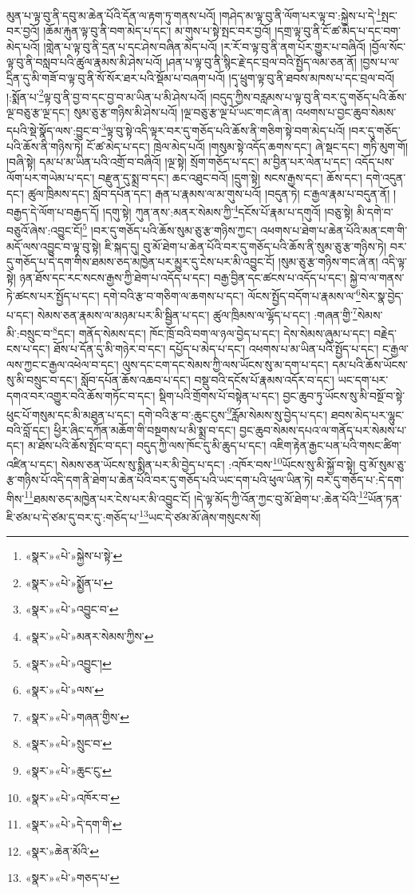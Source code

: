 མུན་པ་ལྟ་བུ་ནི་དབུ་མ་ཆེན་པོའི་དོན་ལ་རྟག་ཏུ་གནས་པའོ། །གཤེད་མ་ལྟ་བུ་ནི་ལོག་པར་ལྟ་བ་:སྐྱེས་པ་དེ་\footnote{«སྣར་»«པེ་»སྐྱེས་པ་སྟེ་}སྤང་བར་བྱའོ། །ཆོམ་རྐུན་ལྟ་བུ་ནི་བག་མེད་པ་དང་། མ་གུས་པ་སྟེ་སྤང་བར་བྱའོ། །དགྲ་ལྟ་བུ་ནི་ངོ་ཚ་མེད་པ་དང་བག་མེད་པའོ། །གླེན་པ་ལྟ་བུ་ནི་དྲན་པ་དང་ཤེས་བཞིན་མེད་པའོ། །ར་རོ་བ་ལྟ་བུ་ནི་ནག་པོར་གྱུར་པ་བཞིའོ། །བྱོལ་སོང་ལྟ་བུ་ནི་བསླབ་པའི་ཚུལ་རྣམས་མི་ཤེས་པའོ། །ཤན་པ་ལྟ་བུ་ནི་སྙིང་རྗེ་དང་བྲལ་བའི་སྤྱོད་ལམ་ཅན་ནོ། །བྱས་པ་ལ་དྲིན་དུ་མི་གཟོ་བ་ལྟ་བུ་ནི་སོ་སོར་ཐར་པའི་སྡོམ་པ་བཞག་པའོ། །དྭ་ཕྲུག་ལྟ་བུ་ནི་ཐབས་མཁས་པ་དང་བྲལ་བའོ། །:སྨོན་པ་\footnote{«སྣར་»«པེ་»སྨྱོན་པ་}ལྟ་བུ་ནི་བྱ་བ་དང་བྱ་བ་མ་ཡིན་པ་མི་ཤེས་པའོ། །བདུད་ཀྱིས་བརླམས་པ་ལྟ་བུ་ནི་བར་དུ་གཅོད་པའི་ཆོས་ལྔ་བཅུ་རྩ་ལྔ་དང་། སུམ་ཅུ་རྩ་གཉིས་མི་ཤེས་པའོ། །ལྔ་བཅུ་རྩ་ལྔ་པོ་ཡང་གང་ཞེ་ན། འཕགས་པ་བྱང་ཆུབ་སེམས་དཔའི་སྡེ་སྣོད་ལས་:བྱུང་བ་\footnote{«སྣར་»«པེ་»འབྱུང་བ་}ལྟ་བུ་སྟེ་འདི་ལྟར་བར་དུ་གཅོད་པའི་ཆོས་ནི་གཅིག་སྟེ་བག་མེད་པའོ། །བར་དུ་གཅོད་པའི་ཆོས་ནི་གཉིས་ཏེ། ངོ་ཚ་མེད་པ་དང་། ཁྲེལ་མེད་པའོ། །གསུམ་སྟེ་འདོད་ཆགས་དང་། ཞེ་སྡང་དང་། གཏི་མུག་གོ། །བཞི་སྟེ། དམ་པ་མ་ཡིན་པའི་འགྲོ་བ་བཞིའོ། །ལྔ་སྟེ། སྲོག་གཅོད་པ་དང་། མ་བྱིན་པར་ལེན་པ་དང་། འདོད་པས་ལོག་པར་གཡེམ་པ་དང་། བརྫུན་དུ་སྨྲ་བ་དང་། ཆང་འཐུང་བའོ། །དྲུག་སྟེ། སངས་རྒྱས་དང་། ཆོས་དང་། དགེ་འདུན་དང་། ཚུལ་ཁྲིམས་དང་། སློབ་དཔོན་དང་། རྒན་པ་རྣམས་ལ་མ་གུས་པའོ། །བདུན་ཏེ། ང་རྒྱལ་རྣམ་པ་བདུན་ནོ། །བརྒྱད་དེ་ལོག་པ་བརྒྱད་དོ། །དགུ་སྟེ། ཀུན་ནས་:མནར་སེམས་ཀྱི་\footnote{«སྣར་»«པེ་»མནར་སེམས་ཀྱིས་}དངོས་པོ་རྣམ་པ་དགུའོ། །བཅུ་སྟེ། མི་དགེ་བ་བཅུའོ་ཞེས་:འབྱུང་ངོ།\footnote{«སྣར་»«པེ་»འབྱུང་།} །བར་དུ་གཅོད་པའི་ཆོས་སུམ་ཅུ་རྩ་གཉིས་ཀྱང་། འཕགས་པ་ཐེག་པ་ཆེན་པོའི་མན་ངག་གི་མདོ་ལས་འབྱུང་བ་ལྟ་བུ་སྟེ། ཇི་སྐད་དུ། བུ་མོ་ཐེག་པ་ཆེན་པོའི་བར་དུ་གཅོད་པའི་ཆོས་ནི་སུམ་ཅུ་རྩ་གཉིས་ཏེ། བར་དུ་གཅོད་པ་དེ་དག་གིས་ཐམས་ཅད་མཁྱེན་པར་མྱུར་དུ་ངེས་པར་མི་འབྱུང་ངོ། །སུམ་ཅུ་རྩ་གཉིས་གང་ཞེ་ན། འདི་ལྟ་སྟེ། ཉན་ཐོས་དང་རང་སངས་རྒྱས་ཀྱི་ཐེག་པ་འདོད་པ་དང་། བརྒྱ་བྱིན་དང་ཚངས་པ་འདོད་པ་དང་། སྐྱེ་བ་ལ་གནས་ཏེ་ཚངས་པར་སྤྱོད་པ་དང་། དགེ་བའི་རྩ་བ་གཅིག་ལ་ཆགས་པ་དང་། ལོངས་སྤྱོད་བདོག་པ་རྣམས་ལ་\footnote{«སྣར་»«པེ་»ལས་}སེར་སྣ་བྱེད་པ་དང་། སེམས་ཅན་རྣམས་ལ་མཉམ་པར་མི་སྦྱིན་པ་དང་། ཚུལ་ཁྲིམས་ལ་ལྷོད་པ་དང་། :གཞན་གྱི་\footnote{«སྣར་»«པེ་»གཞན་གྱིས་}སེམས་མི་:བསྲུང་བ་\footnote{«སྣར་»«པེ་»སྲུང་བ་}དང་། གནོད་སེམས་དང་། ཁོང་ཁྲོ་བའི་བག་ལ་ཉལ་བྱེད་པ་དང་། དེས་སེམས་ཞུམ་པ་དང་། བརྗེད་ངས་པ་དང་། ཐོས་པ་དོན་དུ་མི་གཉེར་བ་དང་། དཔྱོད་པ་མེད་པ་དང་། འཕགས་པ་མ་ཡིན་པའི་སྤྱོད་པ་དང་། ང་རྒྱལ་ལས་ཀྱང་ང་རྒྱལ་འཕེལ་བ་དང་། ལུས་དང་ངག་དང་སེམས་ཀྱི་ལས་ཡོངས་སུ་མ་དག་པ་དང་། དམ་པའི་ཆོས་ཡོངས་སུ་མི་བསྲུང་བ་དང་། སློབ་དཔོན་ཆོས་འཆབ་པ་དང་། བསྡུ་བའི་དངོས་པོ་རྣམས་འདོར་བ་དང་། ཡང་དག་པར་དགའ་བར་འགྱུར་བའི་ཆོས་གཏོང་བ་དང་། སྡིག་པའི་གྲོགས་པོ་བསྟེན་པ་དང་། བྱང་ཆུབ་ཏུ་ཡོངས་སུ་མི་བསྔོ་བ་སྟེ་ཕུང་པོ་གསུམ་དང་མི་མཐུན་པ་དང་། དགེ་བའི་རྩ་བ་:ཆུང་ངུས་\footnote{«སྣར་»«པེ་»ཆུང་ངུ་}རློམ་སེམས་སུ་བྱེད་པ་དང་། ཐབས་མེད་པར་ལྷུང་བའི་བློ་དང་། ཕྱིར་ཞིང་དཀོན་མཆོག་གི་བསྔགས་པ་མི་སྨྲ་བ་དང་། བྱང་ཆུབ་སེམས་དཔའ་ལ་གནོད་པར་སེམས་པ་དང་། མ་ཐོས་པའི་ཆོས་སྤོང་བ་དང་། བདུད་ཀྱི་ལས་ཁོང་དུ་མི་ཆུད་པ་དང་། འཇིག་རྟེན་རྒྱང་པན་པའི་གསང་ཚིག་འཛིན་པ་དང་། སེམས་ཅན་ཡོངས་སུ་སྨིན་པར་མི་བྱེད་པ་དང་། :འཁོར་བས་\footnote{«སྣར་»«པེ་»འཁོར་བ་}ཡོངས་སུ་མི་སྐྱོ་བ་སྟེ། བུ་མོ་སུམ་ཅུ་རྩ་གཉིས་པོ་འདི་དག་ནི་ཐེག་པ་ཆེན་པོའི་བར་དུ་གཅོད་པའི་ཡང་དག་པའི་ཕུལ་ཡིན་ཏེ། བར་དུ་གཅོད་པ་:དེ་དག་གིས་\footnote{«སྣར་»«པེ་»དེ་དག་གི་}ཐམས་ཅད་མཁྱེན་པར་ངེས་པར་མི་འབྱུང་ངོ། །དེ་ལྟ་མོད་ཀྱི་འོན་ཀྱང་བུ་མོ་ཐེག་པ་:ཆེན་པོའི་\footnote{«སྣར་»ཆེན་མོའི་}ཡོན་ཏན་ཇི་ཙམ་པ་དེ་ཙམ་དུ་བར་དུ་:གཅོད་པ་\footnote{«སྣར་»«པེ་»གཅད་པ་}ཡང་དེ་ཙམ་མོ་ཞེས་གསུངས་སོ། 
